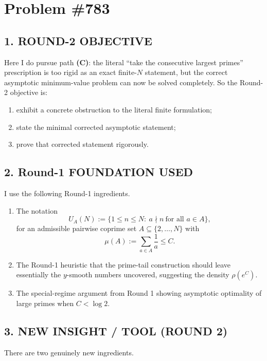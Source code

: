 \section{Problem \#783}

\subsection*{1. ROUND-2 OBJECTIVE}

Here I do pursue path \textbf{(C)}: the literal ``take the consecutive largest primes'' prescription is too rigid as an exact finite-$N$ statement, but the correct asymptotic minimum-value problem can now be solved completely. So the Round-2 objective is:

\begin{enumerate}
\item exhibit a concrete obstruction to the literal finite formulation;
\item state the minimal corrected asymptotic statement;
\item prove that corrected statement rigorously.
\end{enumerate}

\subsection*{2. Round-1 FOUNDATION USED}

I use the following Round-1 ingredients.

\begin{enumerate}
\item The notation
\[
U_A(N):=\{1\leq n\leq N:\ a\nmid n\ \mbox{for all }a\in A\},
\]
for an admissible pairwise coprime set $A\subseteq\{2,\dots,N\}$ with
\[
\mu(A):=\sum_{a\in A}\frac{1}{a}\leq C.
\]
\item The Round-1 heuristic that the prime-tail construction should leave essentially the $y$-smooth numbers uncovered, suggesting the density $\rho(e^C)$.
\item The special-regime argument from Round 1 showing asymptotic optimality of large primes when $C<\log 2$.
\end{enumerate}

\subsection*{3. NEW INSIGHT / TOOL (ROUND 2)}

There are two genuinely new ingredients.

